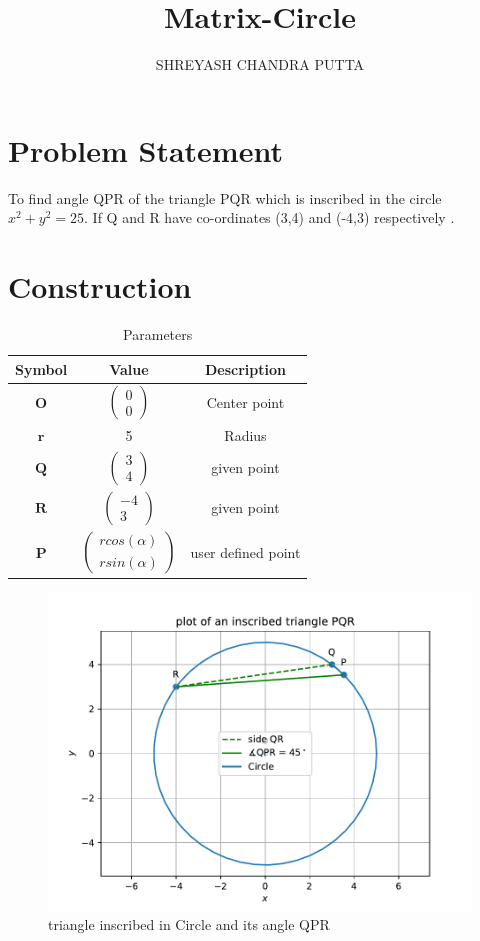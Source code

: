 \documentclass[journal,12pt,twocolumn]{article}
\title{Matrix-Circle}
\author{SHREYASH CHANDRA PUTTA}
\newcommand{\myvec}[1]{\ensuremath{\begin{pmatrix}#1\end{pmatrix}}}
\let\vec\mathbf
\begin{document}
\maketitle
\tableofcontents
\bigskip
\section{Problem Statement}
To find angle QPR of the triangle PQR which is inscribed in the circle $x^2 + y^2 = 25$. If Q and R  have  co-ordinates (3,4) and (-4,3) respectively .
\section{Construction}
 {\begin{table}[h]
    \centering
    \begin{tabular}{|c|c|c|}
       \hline
       \textbf{Symbol}&\textbf{Value}&\textbf{Description}  \\
       \hline
       $\vec{O}$ & $\myvec{
		    0\\
		    0}$
	    & Center point\\
        \hline
        $\vec{r}$ & 5
	    & Radius\\
        \hline
	    $\vec{Q}$ & $\myvec{
		    3\\
		    4}$
	    & given point\\
        \hline
	    $\vec{R}$ & $\myvec{-4\\3}$
 & given point\\
        \hline
	    $\vec{P}$ & $\myvec{rcos(\alpha)\\
  rsin(\alpha)}$
 & user defined point \\
       \hline
    \end{tabular}
    \caption{Parameters}
    \label{tab:my_label}
\end{table}}
\begin{figure}[h]
    \centering
\includegraphics[width=\columnwidth]{fig/circlefig.pdf}
    \caption{triangle inscribed in Circle and its angle QPR }
    \label{fig:my_label}
\end{figure}
\vspace{0cm}
\end{document}
